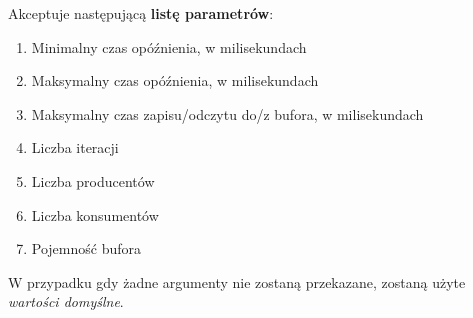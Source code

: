 \documentclass[11pt]{article}
\providecommand{\tightlist}{%
      \setlength{\itemsep}{0pt}\setlength{\parskip}{0pt}}
\begin{document}
Akceptuje następującą \textbf{listę parametrów}:

\begin{enumerate}
\def\labelenumi{\arabic{enumi}.}
\tightlist
\item
  Minimalny czas opóźnienia, w milisekundach
\item
  Maksymalny czas opóźnienia, w milisekundach
\item
  Maksymalny czas zapisu/odczytu do/z bufora, w milisekundach
\item
  Liczba iteracji
\item
  Liczba producentów
\item
  Liczba konsumentów
\item
  Pojemność bufora
\end{enumerate}

W przypadku gdy żadne argumenty nie zostaną przekazane, zostaną użyte
\emph{wartości domyślne}.
\end{document}
